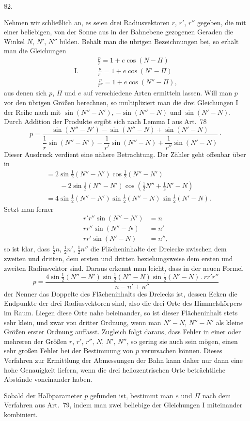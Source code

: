 \par{}\medskip
\hypertarget{native-111-article082}{}
\begin{center}82.\end{center}
Nehmen wir schließlich an, es seien drei Radiusvektoren $r$, $r'$, $r''$ gegeben, die mit einer beliebigen, von der Sonne aus in der Bahnebene gezogenen Geraden die Winkel $N$, $N'$, $N''$ bilden. Behält man die übrigen Bezeichnungen bei, so erhält man die Gleichungen
\[
\begin{aligned}
&\frac{p}{r}=1+e\cos(N-\Pi)\\[4pt]
\mathrm{I.}\qquad&\frac{p}{r'}=1+e\cos(N'-\Pi)\\[4pt]
&\frac{p}{r''}=1+e\cos(N''-\Pi),
\end{aligned}
\]
aus denen sich $p$, $\Pi$ und $e$ auf verschiedene Arten ermitteln lassen. Will man $p$ vor den übrigen Größen berechnen, so multipliziert man die drei Gleichungen I der Reihe nach mit $\sin(N''-N')$, $-\sin(N''-N)$ und $\sin(N'-N)$. Durch Addition der Produkte ergibt sich nach Lemma I aus Art.\ 78
\[
p=\frac{\sin(N''-N')-\sin(N''-N)+\sin(N'-N)}{\dfrac1r\sin(N''-N')-\dfrac1{r'}\sin(N''-N)+\dfrac1{r''}\sin(N'-N)}\mathpunct{\cdot}
\]
Dieser Ausdruck verdient eine nähere Betrachtung. Der Zähler geht offenbar über in
\[
\begin{aligned}
&=2\sin\tfrac12(N''-N')\cos\tfrac12(N''-N')\\
&\qquad-2\sin\tfrac12(N''-N')\cos(\tfrac12N''+\tfrac12N'-N)\\
&=4\sin\tfrac12(N''-N')\sin\tfrac12(N''-N)\sin\tfrac12(N'-N).
\end{aligned}
\]
Setzt man ferner
\[
\begin{aligned}
r'r''\sin(N''-N')&=n\\
rr''\sin(N''-N)&=n'\\
rr'\sin(N'-N)&=n'',
\end{aligned}
\]
so ist klar, dass $\tfrac12n$, $\tfrac12n'$, $\tfrac12n''$ die Flächeninhalte der Dreiecke zwischen dem zweiten und dritten, dem ersten und dritten beziehungsweise dem ersten und zweiten Radiusvektor sind. Daraus erkennt man leicht, dass in der neuen Formel
\[
p=\frac{4\sin\tfrac12(N''-N')\sin\tfrac12(N''-N)\sin\tfrac12(N'-N)\mathbin{.}rr'r''}{n-n'+n''}
\]
der Nenner das Doppelte des Flächeninhalts des Dreiecks ist, dessen Ecken die Endpunkte der drei Radiusvektoren sind, also die drei Orte des Himmelskörpers im Raum. Liegen diese Orte nahe beieinander, so ist dieser Flächeninhalt stets sehr klein, und zwar von dritter Ordnung, wenn man $N'-N$, $N''-N'$ als kleine Größen erster Ordnung auffasst. Zugleich folgt daraus, dass Fehler in einer oder mehreren der Größen $r$, $r'$, $r''$, $N$, $N'$, $N''$, so gering sie auch sein mögen, einen sehr großen Fehler bei der Bestimmung von $p$ verursachen können. Dieses Verfahren zur Ermittlung der Abmessungen der Bahn kann daher nur dann eine hohe Genauigkeit liefern, wenn die drei heliozentrischen Orte beträchtliche Abstände voneinander haben.

Sobald der Halbparameter $p$ gefunden ist, bestimmt man $e$ und $\Pi$ nach dem Verfahren aus Art.\ 79, indem man zwei beliebige der Gleichungen I miteinander kombiniert.
